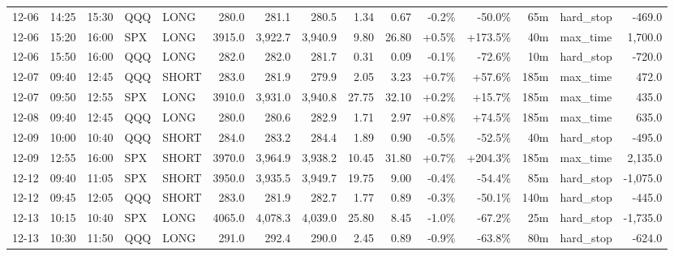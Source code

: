 \documentclass[11pt,a4paper,twoside]{article}
\begin{document}
\begin{landscape}
\begin{center}
\begin{longtable}{>{\color{txtmain}}l l l l l r r r r r r r r >{\color{txtmain}}l r}
12-06 & 14:25 & 15:30 & QQQ & LONG & 280.0 & 281.1 & 280.5 & 1.34 & 0.67 & \textcolor{lossred}{-0.2\%} & \textcolor{lossred}{-50.0\%} & 65m & hard\_stop & \textcolor{lossred}{-469.0} \\
12-06 & 15:20 & 16:00 & SPX & LONG & 3915.0 & 3,922.7 & 3,940.9 & 9.80 & 26.80 & \textcolor{wingreen}{+0.5\%} & \textcolor{wingreen}{+173.5\%} & 40m & max\_time & \textcolor{wingreen}{1,700.0} \\
12-06 & 15:50 & 16:00 & QQQ & LONG & 282.0 & 282.0 & 281.7 & 0.31 & 0.09 & \textcolor{lossred}{-0.1\%} & \textcolor{lossred}{-72.6\%} & 10m & hard\_stop & \textcolor{lossred}{-720.0} \\
12-07 & 09:40 & 12:45 & QQQ & SHORT & 283.0 & 281.9 & 279.9 & 2.05 & 3.23 & \textcolor{wingreen}{+0.7\%} & \textcolor{wingreen}{+57.6\%} & 185m & max\_time & \textcolor{wingreen}{472.0} \\
12-07 & 09:50 & 12:55 & SPX & LONG & 3910.0 & 3,931.0 & 3,940.8 & 27.75 & 32.10 & \textcolor{wingreen}{+0.2\%} & \textcolor{wingreen}{+15.7\%} & 185m & max\_time & \textcolor{wingreen}{435.0} \\
12-08 & 09:40 & 12:45 & QQQ & LONG & 280.0 & 280.6 & 282.9 & 1.71 & 2.97 & \textcolor{wingreen}{+0.8\%} & \textcolor{wingreen}{+74.5\%} & 185m & max\_time & \textcolor{wingreen}{635.0} \\
12-09 & 10:00 & 10:40 & QQQ & SHORT & 284.0 & 283.2 & 284.4 & 1.89 & 0.90 & \textcolor{lossred}{-0.5\%} & \textcolor{lossred}{-52.5\%} & 40m & hard\_stop & \textcolor{lossred}{-495.0} \\
12-09 & 12:55 & 16:00 & SPX & SHORT & 3970.0 & 3,964.9 & 3,938.2 & 10.45 & 31.80 & \textcolor{wingreen}{+0.7\%} & \textcolor{wingreen}{+204.3\%} & 185m & max\_time & \textcolor{wingreen}{2,135.0} \\
12-12 & 09:40 & 11:05 & SPX & SHORT & 3950.0 & 3,935.5 & 3,949.7 & 19.75 & 9.00 & \textcolor{lossred}{-0.4\%} & \textcolor{lossred}{-54.4\%} & 85m & hard\_stop & \textcolor{lossred}{-1,075.0} \\
12-12 & 09:45 & 12:05 & QQQ & SHORT & 283.0 & 281.9 & 282.7 & 1.77 & 0.89 & \textcolor{lossred}{-0.3\%} & \textcolor{lossred}{-50.1\%} & 140m & hard\_stop & \textcolor{lossred}{-445.0} \\
12-13 & 10:15 & 10:40 & SPX & LONG & 4065.0 & 4,078.3 & 4,039.0 & 25.80 & 8.45 & \textcolor{lossred}{-1.0\%} & \textcolor{lossred}{-67.2\%} & 25m & hard\_stop & \textcolor{lossred}{-1,735.0} \\
12-13 & 10:30 & 11:50 & QQQ & LONG & 291.0 & 292.4 & 290.0 & 2.45 & 0.89 & \textcolor{lossred}{-0.9\%} & \textcolor{lossred}{-63.8\%} & 80m & hard\_stop & \textcolor{lossred}{-624.0} \\

\end{longtable}
\end{center}
\end{landscape}
\end{document}
